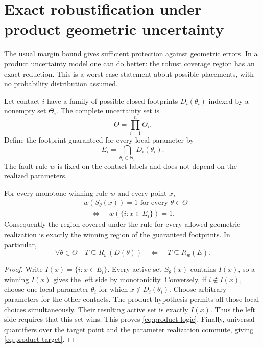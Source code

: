\section{Exact robustification under product geometric uncertainty}
\label{sec:uncertainty}
The usual margin bound gives sufficient protection against geometric errors. In a product uncertainty model one can do better: the robust coverage region has an exact reduction. This is a worst-case statement about possible placements, with no probability distribution assumed.

Let contact $i$ have a family of possible closed footprints $D_i(\theta_i)$ indexed by a nonempty set $\Theta_i$. The complete uncertainty set is
\[
\Theta=\prod_{i=1}^n\Theta_i.
\]
Define the footprint guaranteed for every local parameter by
\begin{equation}\label{eq:guaranteed-footprint}
E_i=\bigcap_{\theta_i\in\Theta_i}D_i(\theta_i).
\end{equation}
The fault rule $w$ is fixed on the contact labels and does not depend on the realized parameters.

\begin{theorem}\label{thm:product}
For every monotone winning rule $w$ and every point $x$,
\begin{equation}\label{eq:product-logic}
\begin{aligned}
&w(S_\theta(x))=1\text{ for every }\theta\in\Theta\\
&\quad\Longleftrightarrow\quad w(\{i:x\in E_i\})=1.
\end{aligned}
\end{equation}
Consequently the region covered under the rule for every allowed geometric realization is exactly the winning region of the guaranteed footprints. In particular,
\begin{equation}\label{eq:product-target}
\forall\theta\in\Theta\quad T\subseteq R_w(D(\theta))
\quad\Longleftrightarrow\quad T\subseteq R_w(E).
\end{equation}
\end{theorem}
\begin{proof}
Write $I(x)=\{i:x\in E_i\}$. Every active set $S_\theta(x)$ contains $I(x)$, so a winning $I(x)$ gives the left side by monotonicity. Conversely, if $i\notin I(x)$, choose one local parameter $\theta_i$ for which $x\notin D_i(\theta_i)$. Choose arbitrary parameters for the other contacts. The product hypothesis permits all those local choices simultaneously. Their resulting active set is exactly $I(x)$. Thus the left side requires that this set wins. This proves \cref{eq:product-logic}. Finally, universal quantifiers over the target point and the parameter realization commute, giving \cref{eq:product-target}.
\end{proof}

